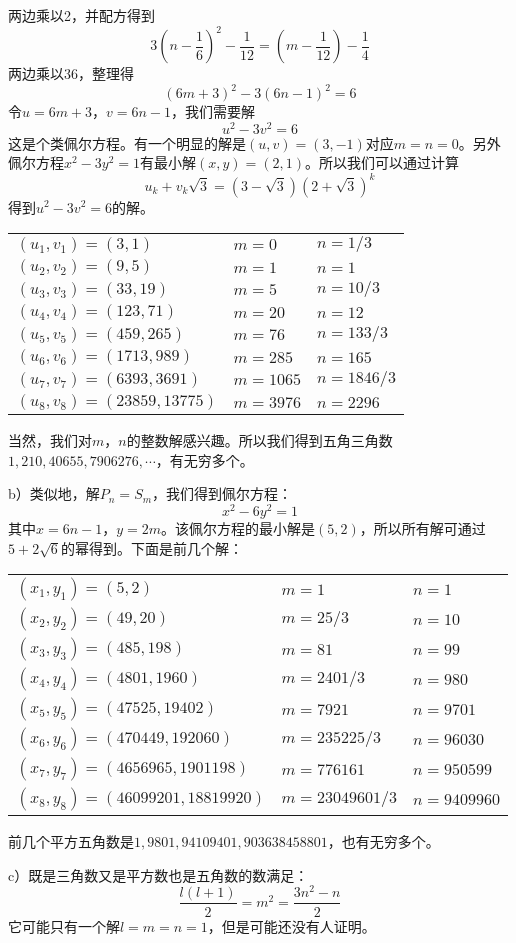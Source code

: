 两边乘以2，并配方得到
\[3\left(n-\frac{1}{6}\right)^2-\frac{1}{12}=\left(m-\frac{1}{12}\right)-\frac{1}{4}\]
两边乘以36，整理得
\[(6m+3)^2-3(6n-1)^2=6\]
令$u=6m+3$，$v=6n-1$，我们需要解
\[u^2-3v^2=6\]
这是个类佩尔方程。有一个明显的解是$(u,v)=(3,-1)$对应$m=n=0$。另外佩尔方程$x^2-3y^2=1$有最小解$(x,y)=(2,1)$。所以我们可以通过计算
\[u_k+v_k\sqrt3=(3-\sqrt3)(2+\sqrt3)^k\]
得到$u^2-3v^2=6$的解。
\begin{center}
    \begin{tabular}{lll}
        $(u_1,v_1)=(3,1)$ & $m=0$ & $n=1/3$ \\
        $(u_2,v_2)=(9,5)$ & $m=1$ & $n=1$ \\
        $(u_3,v_3)=(33,19)$ & $m=5$ & $n=10/3$ \\
        $(u_4,v_4)=(123,71)$ & $m=20$ & $n=12$ \\
        $(u_5,v_5)=(459,265)$ & $m=76$ & $n=133/3$ \\
        $(u_6,v_6)=(1713,989)$ & $m=285$ & $n=165$ \\
        $(u_7,v_7)=(6393,3691)$ & $m=1065$ & $n=1846/3$ \\
        $(u_8,v_8)=(23859,13775)$ & $m=3976$ & $n=2296$ \\
    \end{tabular}
\end{center}
当然，我们对$m$，$n$的整数解感兴趣。所以我们得到五角三角数$1,210,40655,7906276,\cdots$，有无穷多个。\par
b）类似地，解$P_n=S_m$，我们得到佩尔方程：
\[x^2-6y^2=1\]
其中$x=6n-1$，$y=2m$。该佩尔方程的最小解是$(5,2)$，所以所有解可通过$5+2\sqrt6$的幂得到。下面是前几个解：
\begin{center}
    \begin{tabular}{lll}
        $(x_1,y_1)=(5,2)$ & $m=1$ & $n=1$ \\
        $(x_2,y_2)=(49,20)$ & $m=25/3$ & $n=10$ \\
        $(x_3,y_3)=(485,198)$ & $m=81$ & $n=99$ \\
        $(x_4,y_4)=(4801,1960)$ & $m=2401/3$ & $n=980$ \\
        $(x_5,y_5)=(47525,19402)$ & $m=7921$ & $n=9701$ \\
        $(x_6,y_6)=(470449,192060)$ & $m=235225/3$ & $n=96030$ \\
        $(x_7,y_7)=(4656965,1901198)$ & $m=776161$ & $n=950599$ \\
        $(x_8,y_8)=(46099201,18819920)$ & $m=23049601/3$ & $n=9409960$ \\
    \end{tabular}
\end{center}
前几个平方五角数是$1,9801,94109401,903638458801$，也有无穷多个。\par
c）既是三角数又是平方数也是五角数的数满足：
\[\frac{l(l+1)}{2}=m^2=\frac{3n^2-n}{2}\]
它可能只有一个解$l=m=n=1$，但是可能还没有人证明。